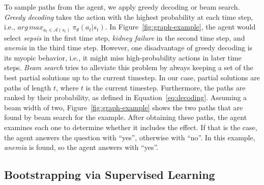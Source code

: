 To sample paths from the agent, we apply greedy decoding or beam search. \emph{Greedy decoding} takes the action with the highest probability at each time step, i.e., $arg\,max_{a_t \in \mathcal{A}(s_t)} \ \pi_{\theta}(a_t | s_t)$. In Figure~\ref{fig:graph-example}, the agent would select \textit{sepsis} in the first time step, \textit{kidney failure} in the second time step, and \textit{anemia} in the third time step. However, one disadvantage of greedy decoding is its myopic behavior, i.e., it might miss high-probability actions in later time steps. \emph{Beam search} tries to alleviate this problem by always keeping a set of the best partial solutions up to the current timestep. 
In our case, partial solutions are paths of length $t$, where $t$ is the current timestep. Furthermore, the paths are ranked by their probability, as defined in Equation~\ref{eq:decoding}. Assuming a beam width of two, Figure~\ref{fig:graph-example} shows the two paths that are found by beam search for the example. After obtaining these paths, the agent examines each one to determine whether it includes the effect. If that is the case, the agent answers the question with ``yes'', otherwise with ``no''. In this example, \textit{anemia} is found, so the agent answers with ``yes''.

\subsection{Bootstrapping via Supervised Learning}
\label{subsec:supervised}

